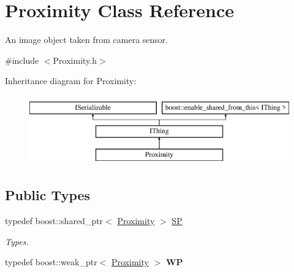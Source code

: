\hypertarget{class_proximity}{}\section{Proximity Class Reference}
\label{class_proximity}


An image object taken from camera sensor.  




{\ttfamily \#include $<$Proximity.\+h$>$}

Inheritance diagram for Proximity\+:\begin{figure}[H]
\begin{center}
\leavevmode
\includegraphics[height=3.000000cm]{class_proximity}
\end{center}
\end{figure}
\subsection*{Public Types}
\begin{DoxyCompactItemize}
\item 
\mbox{\label{class_proximity_ab0f7e4d755afe6b0246a81d027658902}} 
typedef boost\+::shared\+\_\+ptr$<$ \hyperlink{class_proximity}{Proximity} $>$ \hyperlink{class_proximity_ab0f7e4d755afe6b0246a81d027658902}{SP}
\begin{DoxyCompactList}\small\item\em Types. \end{DoxyCompactList}\item 
\mbox{\label{class_proximity_ae2a63a41787c8521156624fa239b570b}} 
typedef boost\+::weak\+\_\+ptr$<$ \hyperlink{class_proximity}{Proximity} $>$ {\bfseries WP}
\end{DoxyCompactItemize}
